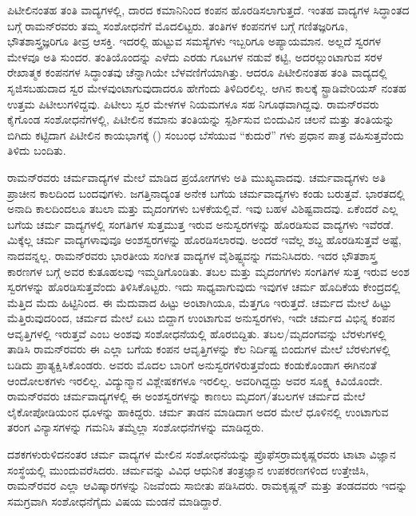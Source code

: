 ಪಿಟೀಲಿನಂತಹ ತಂತಿ ವಾದ್ಯಗಳಲ್ಲಿ, ದಾರದ ಕಮಾನಿನಿಂದ ಕಂಪನ ಹೊರಡಿಸಲಾಗುತ್ತದೆ. ಇಂತಹ ವಾದ್ಯಗಳ ಸಿದ್ಧಾಂತದ ಬಗ್ಗೆ ರಾಮನ್‍ರವರು ತಮ್ಮ ಸಂಶೋಧನೆಗೆ ಮೊದಲಿಟ್ಟರು. ತಂತಿಗಳ ಕಂಪನಗಳ ಬಗ್ಗೆ ಗಣಿತಜ್ಞರಿಗೂ, ಭೌತಶಾಸ್ತ್ರಜ್ಞರಿಗೂ ತೀವ್ರ ಆಸಕ್ತಿ. ಇದರಲ್ಲಿ ಹುಟ್ಟುವ ಸಮಸ್ಯೆಗಳು ಇಬ್ಬರಿಗೂ ಅಪ್ಯಾಯಮಾನ. ಅಲ್ಲದೆ ಸ್ವರಗಳ ಮೇಳವೂ ಅತಿ ಸುಂದರ. ತಂತಿಯೊಂದನ್ನು ಎಳೆದು ಎರಡು ಗೂಟಗಳ ನಡುವೆ ಕಟ್ಟಿ, ಅದರಲ್ಲುಂಟಾಗುವ ಸರಳ ರೇಖಾತ್ಮಕ ಕಂಪನಗಳ ಸಿದ್ಧಾಂತವು ಚೆನ್ನಾಗಿಯೇ ಬೆಳವಣಿಗೆಯಾಗಿತ್ತು. ಆದರೂ ಪಿಟೀಲಿನಂತಹ ತಂತಿ ವಾದ್ಯದಲ್ಲಿ ಸೃಜಿಸಬಹುದಾದ ಸ್ವರ ಮೇಳವುಂಟಾಗುವುದಾದರೂ ಹೇಗೆಂದು ತಿಳಿದಿರಲಿಲ್ಲ. ಆಗಿನ ಕಾಲಕ್ಕೆ ಸ್ಟ್ರಾಡಿವೇರಿಯಸ್ ನಂತಹ ಉತ್ತಮ ಪಿಟೀಲುಗಳಿದ್ದವು. ಪಿಟೀಲು ಸ್ವರ ಮೇಳಗಳ ನಿಯಮಗಳೂ ಸಹ ನಿಗೂಢವಾಗಿದ್ದವು. ರಾಮನ್‍ರವರು ಕೈಗೊಂಡ ಸಂಶೋಧನೆಗಳಲ್ಲಿ, ಪಿಟೀಲಿನ ಕಮಾನು ತಂತಿಯನ್ನು ಸ್ಪರ್ಶಿಸುವ ಬಿಂದುವಿನ ಚಲನೆ ಮತ್ತು ತಂತಿಯನ್ನು ಬಿಗಿದು ಕಟ್ಟಿದಾಗ ಪಿಟೀಲಿನ ಕಾಯಭಾಗಕ್ಕೆ () ಸಂಬಂಧ ಬೆಸೆಯುವ “ಕುದುರೆ” ಗಳು ಪ್ರಧಾನ ಪಾತ್ರ ವಹಿಸುತ್ತವೆಂದು ತಿಳಿದು ಬಂದಿತು.

ರಾಮನ್‍ರವರು ಚರ್ಮವಾದ್ಯಗಳ ಮೇಲೆ ಮಾಡಿದ ಪ್ರಯೋಗಗಳು ಅತಿ ಮುಖ್ಯವಾದವು. ಚರ್ಮವಾದ್ಯಗಳು ಅತಿ ಪ್ರಾಚೀನ ಕಾಲದಿಂದ ಬಂದವುಗಳು. ಜಗತ್ತಿನಾದ್ಯಂತ ಅನೇಕ ಬಗೆಯ ಚರ್ಮ\-ವಾದ್ಯಗಳು ಕಂಡು ಬರುತ್ತವೆ. ಭಾರತದಲ್ಲಿ ಅನಾದಿ ಕಾಲದಿಂದಲೂ ತಬಲಾ ಮತ್ತು ಮೃದಂಗಗಳು ಬಳಕೆಯಲ್ಲಿವೆ. ಇವು ಬಹಳ ವಿಶಿಷ್ಟವಾದವು. ಏಕೆಂದರೆ ಎಲ್ಲ ಬಗೆಯ ಚರ್ಮ ವಾದ್ಯಗಳಲ್ಲಿ ಸಂಗತಿಗಳ ಸುತ್ತಮುತ್ತ ಇರುವ ಅನುಸ್ವರಗಳನ್ನು ಹೊರಡಿಸುವ ವಾದ್ಯಗಳು ಇವೆರಡೆ. ಮಿಕ್ಕೆಲ್ಲ ಚರ್ಮ ವಾದ್ಯಗಳಾವುವೂ ಅಂಶಸ್ವರಗಳನ್ನು ಹೊರಡಿಸಲಾರವು. ಅಂದರೆ ಇವೆಲ್ಲ ಶಬ್ದ ಹೊರಡಿಸುತ್ತವೆ ಅಷ್ಟೆ, ನಾದವನ್ನಲ್ಲ. ರಾಮನ್‍ರವರು ಭಾರತೀಯ ಸಂಗೀತ ವಾದ್ಯಗಳ ವೈಶಿಷ್ಟ್ಯವನ್ನು ಗಮನಿಸಿದರು. ಇದರ ಭೌತಶಾಸ್ತ್ರ ಕಾರಣಗಳ ಬಗ್ಗೆ ಅವರ ಕುತೂಹಲವು ಇಮ್ಮಡಿಗೊಂಡಿತು. ತಬಲ ಮತ್ತು ಮೃದಂಗಗಳು ಸಂಗತಿಗಳ ಸುತ್ತ ಇರುವ ಅಂಶ ಸ್ವರಗಳನ್ನು ಹೊರಡಿಸುತ್ತವೆಂದು ತಿಳಿಸಿಕೊಟ್ಟರು. ಇದು ಸಾಧ್ಯವಾಗುವುದು ಇವುಗಳ ಚರ್ಮ ಹೊದಿಕೆಯ ಕೇಂದ್ರದಲ್ಲಿ ಮೆತ್ತಿದ ಮೆದು ಹಿಟ್ಟಿನಿಂದ. ಈ ಮೆದುವಾದ ಹಿಟ್ಟು ಅಂಟಾಗಿಯೂ, ಮೆತ್ತಗೂ ಇರುತ್ತದೆ. ಚರ್ಮದ ಮೇಲೆ ಹಿಟ್ಟು ಮೆತ್ತಿರುವುದರಿಂದ, ಚರ್ಮದ ಮೇಲೆ ಏಟು ಬಿದ್ದಾಗ ಉಂಟಾಗುವ ಅನುಸ್ವರಗಳು, ಇದೇ ಚರ್ಮದ ವಿಭಿನ್ನ ಕಂಪನ ಆವೃತ್ತಿಗಳಲ್ಲಿ ಇರುತ್ತವೆ ಎಂಬ ಅಂಶವು ಸಂಶೋಧನೆಯಲ್ಲಿ ಹೊರಬಿದ್ದಿತು. ತಬಲ/ಮೃದಂಗವನ್ನು ಬೆರಳುಗಳಲ್ಲಿ ತಾಡಿಸಿ ರಾಮನ್‍ರವರು ಈ ಎಲ್ಲಾ ಬಗೆಯ ಕಂಪನ ಆವೃತ್ತಿಗಳನ್ನು ಕೆಲ ನಿರ್ದಿಷ್ಟ ಬಿಂದುಗಳ ಮೇಲೆ ಬೆರಳುಗಳಲ್ಲಿ ಬಡಿದು ಪ್ರಾತ್ಯಕ್ಷಿಸಿಕೊಂಡರು. ಅವರು ಮೊದಲ ಬಾರಿಗೆ ಅನುಸ್ವರಗಳಿರುತ್ತವೆಂದು ಕಂಡುಕೊಂಡಾಗ ಈಗಿನಂತೆ ಆಂದೋಲಕಗಳು ಇರಲಿಲ್ಲ. ವಿದ್ಯುನ್ಮಾನ ವಿಶ್ಲೇಷಕಗಳೂ ಇರಲಿಲ್ಲ. ಅವರಿಗಿದ್ದದ್ದು ಅವರ ಸೂಕ್ಷ್ಮ ಕಿವಿಯೊಂದೇ. ರಾಮನ್‍ರವರು ಚರ್ಮವಾದ್ಯಗಳಲ್ಲಿ ಈ ಅಂಶಸ್ವರಗಳನ್ನು ಕಾಣಲು ಮೃದಂಗ/ತಬಲಗಳ ಚರ್ಮದ ಮೇಲೆ ಲೈಕೋಪೋಡಿಯಂನ ಧೂಳನ್ನು ಹಾಕಿದ್ದರು. ಚರ್ಮ ತಾಡನ ಮಾಡಿದಾಗ ಅದರ ಮೇಲೆ ಧೂಳಿನಲ್ಲಿ ಉಂಟಾಗುವ ತರಂಗ ವಿನ್ಯಾಸಗಳನ್ನು ಗಮನಿಸಿ ತಮ್ಮೆಲ್ಲಾ ಸಂಶೋಧನೆಗಳನ್ನು ಮಾಡಿದ್ದರು.

ದಶಕಗಳುರುಳಿದನಂತರ ಚರ್ಮ ವಾದ್ಯಗಳ ಮೇಲಿನ ಸಂಶೋಧನೆಯನ್ನು ಪ್ರೊಫೆಸರ್\break ರಾಮಕೃಷ್ಣರವರು ಟಾಟಾ ವಿಜ್ಞಾನ ಸಂಸ್ಥೆಯಲ್ಲಿ ಮುಂದುವರೆಸಿದರು. ಚರ್ಮವನ್ನು ವಿವಿಧ ಆಧುನಿಕ ತಂತ್ರಜ್ಞಾನ ಉಪಕರಣಗಳಿಂದ ಉತ್ತೇಜಿಸಿ, ರಾಮನ್‍ರವರ ಎಲ್ಲಾ ಆವಿಷ್ಕಾರಗಳನ್ನು ನಿಜವೆಂದು ಸಾಬೀತು ಪಡಿಸಿದರು. ರಾಮಕೃಷ್ಣನ್ ಮತ್ತು ತಂಡದವರು ಇದನ್ನು ಸಮಗ್ರವಾಗಿ ಸಂಶೋಧನೆಗೈದು ವಿಷಯ ಮಂಡನೆ ಮಾಡಿದ್ದಾರೆ.

